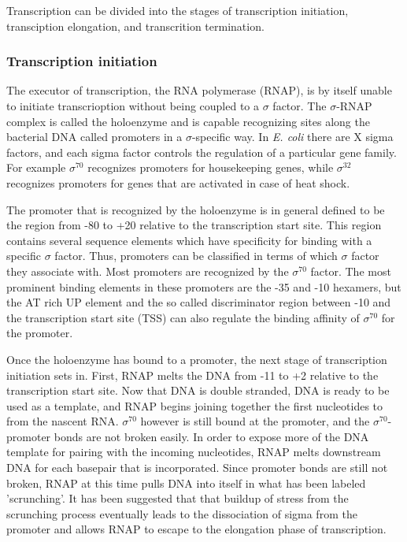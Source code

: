 %
%
Transcription can be divided into the stages of transcription initiation,
transciption elongation, and transcrition termination.

\subsubsection{Transcription initiation}
The executor of transcription, the RNA polymerase (RNAP), is by itself unable
to initiate transcrioption without being coupled to a $\sigma$ factor. The
$\sigma$-RNAP complex is called the holoenzyme and is capable 
recognizing sites along the bacterial DNA called promoters in a
$\sigma$-specific way. In \textit{E. coli} there are X sigma factors, and each
sigma factor controls the regulation of a particular gene family. For example
$\sigma^{70}$ recognizes promoters for housekeeping genes, while $\sigma^{32}$
recognizes promoters for genes that are activated in case of heat shock.

The promoter that is recognized by the holoenzyme is in general defined to be
the region from -80 to +20 relative to the transcription start site. This
region contains several sequence elements which have specificity for binding
with a specific $\sigma$ factor. Thus, promoters can be classified in terms of
which $\sigma$ factor they associate with. Most promoters are recognized by the
$\sigma^{70}$ factor. The most prominent binding elements in these promoters
are the -35 and -10 hexamers, but the AT rich UP element and the so called
discriminator region between -10 and the transcription start site (TSS) can
also regulate the binding affinity of $\sigma^{70}$ for the promoter.

Once the holoenzyme has bound to a promoter, the next stage of transcription
initiation sets in. First, RNAP melts the DNA from -11 to +2 relative to the
transcription start site. Now that DNA is double stranded, DNA is ready to be
used as a template, and RNAP begins joining together the first nucleotides to
from the nascent RNA. $\sigma^{70}$ however is still bound at the promoter, and
the $\sigma^{70}$-promoter bonds are not broken easily. In order to expose more
of the DNA template for pairing with the incoming nucleotides, RNAP melts
downstream DNA for each basepair that is incorporated. Since promoter bonds are
still not broken, RNAP at this time pulls DNA into itself in what has been
labeled 'scrunching'. It has been suggested that that buildup of stress from
the scrunching process eventually leads to the dissociation of sigma from the
promoter and allows RNAP to escape to the elongation phase of transcription.

